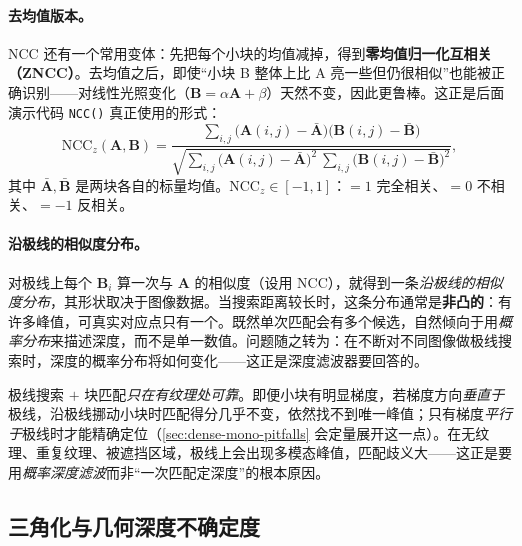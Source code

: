 \paragraph{去均值版本。}
NCC 还有一个常用变体：先把每个小块的均值减掉，得到\textbf{零均值归一化互相关（ZNCC）}。去均值之后，即使“小块 B 整体上比 A 亮一些但仍很相似”也能被正确识别——对线性光照变化（$\mathbf{B}=\alpha\mathbf{A}+\beta$）天然不变，因此更鲁棒。这正是后面演示代码 \texttt{NCC()} 真正使用的形式：
\begin{equation}
  \mathrm{NCC}_z(\mathbf{A},\mathbf{B})=\frac{\displaystyle\sum_{i,j}\bigl(\mathbf{A}(i,j)-\bar{\mathbf{A}}\bigr)\bigl(\mathbf{B}(i,j)-\bar{\mathbf{B}}\bigr)}{\sqrt{\displaystyle\sum_{i,j}\bigl(\mathbf{A}(i,j)-\bar{\mathbf{A}}\bigr)^2\ \sum_{i,j}\bigl(\mathbf{B}(i,j)-\bar{\mathbf{B}}\bigr)^2}},
  \label{eq:dense-zncc}
\end{equation}
其中 $\bar{\mathbf{A}},\bar{\mathbf{B}}$ 是两块各自的标量均值。$\mathrm{NCC}_z\in[-1,1]$：$=1$ 完全相关、$=0$ 不相关、$=-1$ 反相关。

\paragraph{沿极线的相似度分布。}
对极线上每个 $\mathbf{B}_i$ 算一次与 $\mathbf{A}$ 的相似度（设用 NCC），就得到一条\emph{沿极线的相似度分布}，其形状取决于图像数据。当搜索距离较长时，这条分布通常是\textbf{非凸的}：有许多峰值，可真实对应点只有一个。既然单次匹配会有多个候选，自然倾向于用\emph{概率分布}来描述深度，而不是单一数值。问题随之转为：在不断对不同图像做极线搜索时，深度的概率分布将如何变化——这正是深度滤波器要回答的。

\begin{pitfall}
极线搜索 $+$ 块匹配\emph{只在有纹理处可靠}。即便小块有明显梯度，若梯度方向\emph{垂直于}极线，沿极线挪动小块时匹配得分几乎不变，依然找不到唯一峰值；只有梯度\emph{平行于}极线时才能精确定位（\cref{sec:dense-mono-pitfalls} 会定量展开这一点）。在无纹理、重复纹理、被遮挡区域，极线上会出现多模态峰值，匹配歧义大——这正是要用\emph{概率深度滤波}而非“一次匹配定深度”的根本原因。
\end{pitfall}

\subsection{三角化与几何深度不确定度}
\label{sec:dense-triangulate-uncertainty}

